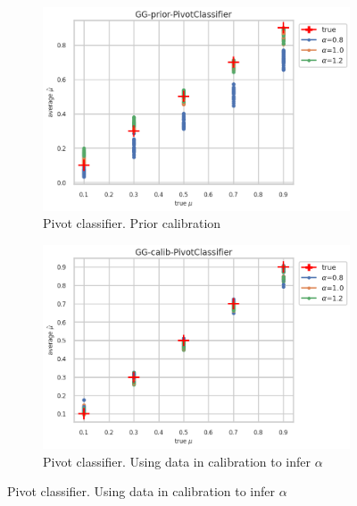 \begin{figure}[ht!]
  \begin{subfigure}[t]{0.49\linewidth}
    \includegraphics[width=\linewidth]{COMPARE/GG-prior/PivotClassifier/profusion_true_mu_target_mean.png}
    \caption{Pivot classifier. Prior calibration}
  \end{subfigure}%
  \hfill
  \begin{subfigure}[t]{0.49\linewidth}
    \includegraphics[width=\linewidth]{COMPARE/GG-calib/PivotClassifier/profusion_true_mu_target_mean.png}
    \caption{Pivot classifier. Using data in calibration to infer $\alpha$}
  \end{subfigure}


\end{figure}
